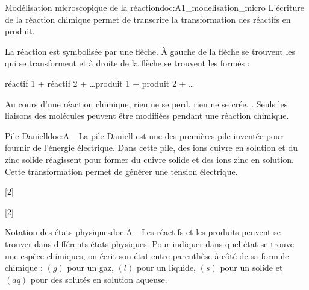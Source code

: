 \begin{doc}{Modélisation microscopique de la réaction}{doc:A1_modelisation_micro}
  L'écriture de la réaction chimique permet de transcrire la transformation des réactifs en produit.
  
  \begin{importants}
    La réaction est symbolisée par une flèche. À gauche de la flèche se trouvent les  qui se transforment et à droite de la flèche se trouvent les  formés :
    \begin{center}
      réactif 1 + réactif 2 + \ldots \reaction produit 1 + produit 2 + \ldots
    \end{center}
  \end{importants}
  
  Au cours d'une réaction chimique, rien ne se perd, rien ne se crée. .
  Seuls les liaisons des molécules peuvent être modifiées pendant une réaction chimique.
\end{doc}

\begin{doc}{Pile Daniell}{doc:A_}
  La pile Daniell est une des premières pile inventée pour fournir de l'énergie électrique.
  Dans cette pile, des ions cuivre  en solution et du zinc solide  réagissent pour former du cuivre solide  et des ions zinc  en solution.
  Cette transformation permet de générer une tension électrique.
\end{doc}

\vspace*{-30pt}
[2]

[2]


\begin{doc}{Notation des états physiques}{doc:A_}
  Les réactifs et les produits peuvent se trouver dans différents états physiques.
  Pour indiquer dans quel état se trouve une espèce chimiques, on écrit son état entre parenthèse à côté de sa formule chimique : $(g)$ pour un gaz, $(l)$ pour un liquide, $(s)$ pour un solide et $(aq)$ pour des solutés en solution aqueuse.
\end{doc}

